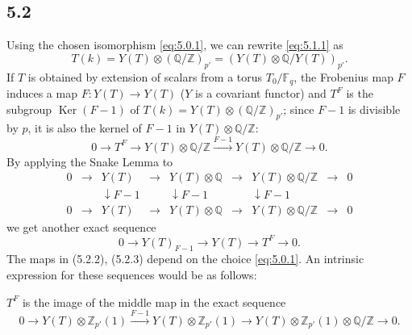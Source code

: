 \documentclass[11pt]{amsart}
\theoremstyle{plain}
\theoremstyle{remark}
\DeclareMathOperator{\Ker}{Ker}
\begin{document}
\subsection{5.2} Using the chosen isomorphism \eqref{eq:5.0.1}, we can rewrite \eqref{eq:5.1.1} as
\begin{equation}\label{eq:5.2.1}
T(k) = Y(T) \otimes (\mathbb{Q}/\mathbb{Z})_{p'} = (Y(T) \otimes \mathbb{Q}/Y(T))_{p'}.
\end{equation}
If $T$ is obtained by extension of scalars from a torus $T_0/\mathbb{F}_q$, the Frobenius map $F$ induces a map $F: Y(T) \to Y(T)$ ($Y$ is a covariant functor) and $T^F$ is the subgroup $\Ker(F - 1)$ of $T(k) = Y(T) \otimes (\mathbb{Q}/\mathbb{Z})_{p'}$; since $F - 1$ is divisible by $p$, it is also the kernel of $F - 1$ in $Y(T) \otimes \mathbb{Q}/\mathbb{Z}$:
\begin{equation}\label{eq:5.2.2}
0 \longrightarrow T^F \longrightarrow Y(T) \otimes \mathbb{Q}/\mathbb{Z} \xrightarrow{F-1} Y(T) \otimes \mathbb{Q}/\mathbb{Z} \longrightarrow 0.
\end{equation}
By applying the Snake Lemma to
\[
\begin{array}{ccccccccc}
0 & \longrightarrow & Y(T) & \longrightarrow & Y(T) \otimes \mathbb{Q} & \longrightarrow & Y(T) \otimes \mathbb{Q}/\mathbb{Z} & \longrightarrow & 0 \\
& & \downarrow{F-1} & & \downarrow{F-1} & & \downarrow{F-1} & & \\
0 & \longrightarrow & Y(T) & \longrightarrow & Y(T) \otimes \mathbb{Q} & \longrightarrow & Y(T) \otimes \mathbb{Q}/\mathbb{Z} & \longrightarrow & 0
\end{array}
\]
we get another exact sequence
\begin{equation}\label{eq:5.2.3}
0 \longrightarrow Y(T)_{F-1} \longrightarrow Y(T) \longrightarrow T^F \longrightarrow 0.
\end{equation}
The maps in (5.2.2), (5.2.3) depend on the choice \eqref{eq:5.0.1}. An intrinsic expression for these sequences would be as follows:

$T^F$ is the image of the middle map in the exact sequence
\[
0 \longrightarrow Y(T) \otimes \mathbb{Z}_{p'}(1) \xrightarrow{F-1} Y(T) \otimes \mathbb{Z}_{p'}(1) \longrightarrow Y(T) \otimes \mathbb{Z}_{p'}(1) \otimes \mathbb{Q}/\mathbb{Z} \longrightarrow 0.
\]
\end{document}
